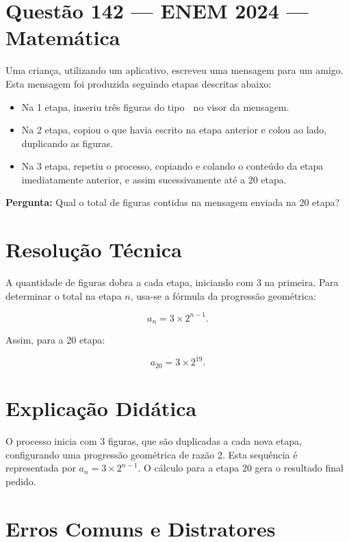 \documentclass{article}
\begin{document}
\section*{Questão 142 — ENEM 2024 — Matemática}

Uma criança, utilizando um aplicativo, escreveu uma mensagem para um amigo. Esta mensagem foi produzida seguindo etapas descritas abaixo:

\begin{itemize}
  \item Na 1\textordfeminine{} etapa, inseriu três figuras do tipo 🙂 no visor da mensagem.
  \item Na 2\textordfeminine{} etapa, copiou o que havia escrito na etapa anterior e colou ao lado, duplicando as figuras.
  \item Na 3\textordfeminine{} etapa, repetiu o processo, copiando e colando o conteúdo da etapa imediatamente anterior, e assim sucessivamente até a 20\textordfeminine{} etapa.
\end{itemize}

\noindent \textbf{Pergunta:} Qual o total de figuras contidas na mensagem enviada na 20\textordfeminine{} etapa?

\section*{Resolução Técnica}

A quantidade de figuras dobra a cada etapa, iniciando com 3 na primeira. Para determinar o total na etapa $n$, usa-se a fórmula da progressão geométrica:

\[
a_n = 3 \times 2^{n-1}.
\]

Assim, para a 20\textordfeminine{} etapa:

\[
a_{20} = 3 \times 2^{19}.
\]

\section*{Explicação Didática}

O processo inicia com 3 figuras, que são duplicadas a cada nova etapa, configurando uma progressão geométrica de razão 2. Esta sequência é representada por $a_n = 3 \times 2^{n-1}$. O cálculo para a etapa 20 gera o resultado final pedido.

\section*{Erros Comuns e Distratores}
\end{document}
